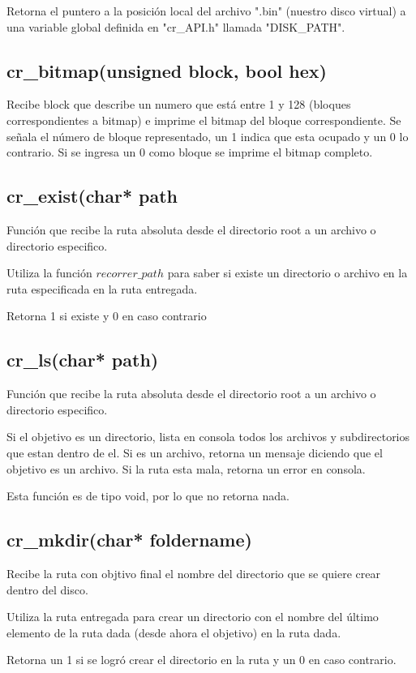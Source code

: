 \documentclass[12pt]{article}
\begin{document}
Retorna el puntero a la posición local del archivo ".bin" (nuestro disco virtual) a una variable global definida en "cr\_API.h" llamada "DISK\_PATH".

\subsection{cr\_bitmap(unsigned block, bool hex)}
Recibe block que describe un numero que está entre 1 y 128 (bloques correspondientes a bitmap) e imprime el bitmap del bloque correspondiente. Se señala el número de bloque representado, un 1 indica que esta ocupado y un 0 lo contrario. Si se ingresa un 0 como bloque se imprime el bitmap completo.


\subsection{cr\_exist(char* path}
Función que recibe la ruta absoluta desde el directorio root a un archivo o directorio especifico.

Utiliza la función $recorrer\_path$ para saber si existe un directorio o archivo en la ruta especificada en la ruta entregada.

Retorna 1 si existe y 0 en caso contrario

\subsection{cr\_ls(char* path)}
Función que recibe la ruta absoluta desde el directorio root a un archivo o directorio especifico.

Si el objetivo es un directorio, lista en consola todos los archivos y subdirectorios que estan dentro de el. Si es un archivo, retorna un mensaje diciendo que el objetivo es un archivo. Si la ruta esta mala, retorna un error en consola.

Esta función es de tipo void, por lo que no retorna nada.

\subsection{cr\_mkdir(char* foldername)}
Recibe la ruta con objtivo final el nombre del directorio que se quiere crear dentro del disco.

Utiliza la ruta entregada para crear un directorio con el nombre del último elemento de la ruta dada (desde ahora el objetivo) en la ruta dada.

Retorna un 1 si se logró crear el directorio en la ruta y un 0 en caso contrario.
\end{document}
